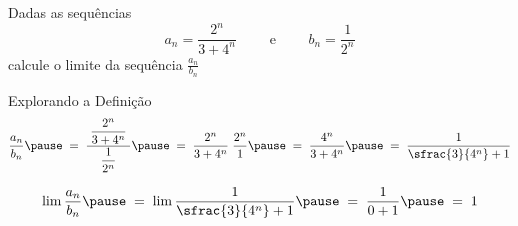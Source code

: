 \begin{question}
  Dadas as sequências
  \[
    a_n = \frac{2^n}{3+4^n}
    \qquad \text{ e } \qquad
    b_n = \frac{1}{2^n}
  \]
  calcule o limite da sequência \(\frac{a_n}{b_n}\)
\end{question}

\begin{resolution}{Explorando a Definição}
  \[
    \frac{a_n}{b_n}
    \pause
    \;=\; \frac{\;\dfrac{2^n}{3+4^n}\;}{\dfrac{1}{2^n}}
    \pause
    \;=\; \frac{2^n}{3+4^n} \; \frac{2^n}{1}
    \pause
    \;=\; \frac{4^n}{3+4^n}
    \pause
    \;=\; \frac{1}{\sfrac{3}{4^n}+1}
  \]

  \pause
  \[
    \lim \frac{a_n}{b_n}
    \pause
    \;=\; \lim \frac{1}{\sfrac{3}{4^n}+1}
    \pause
    \;=\; \frac{1}{0+1}
    \pause
    \;=\; 1
  \]
\end{resolution}

